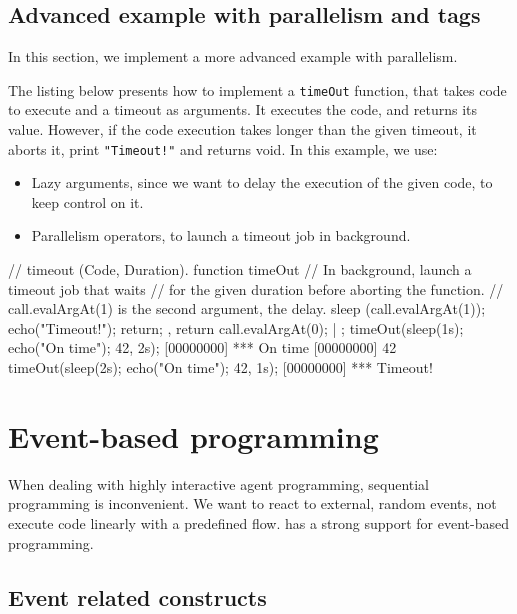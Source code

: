 \section{Advanced example with parallelism and tags}

In this section, we implement a more advanced example with
parallelism.

The listing below presents how to implement a \lstinline{timeOut}
function, that takes code to execute and a timeout as arguments. It
executes the code, and returns its value. However, if the code
execution takes longer than the given timeout, it aborts it, print
\lstinline|"Timeout!"| and returns void. In this example, we use:

\begin{itemize}
\item Lazy arguments, since we want to delay the execution of the
  given code, to keep control on it.
\item Parallelism operators, to launch a timeout job in background.
\end{itemize}

\begin{urbiscript}
// timeout (Code, Duration).
function timeOut
{
  // In background, launch a timeout job that waits
  // for the given duration before aborting the function.
  // call.evalArgAt(1) is the second argument, the delay.
  {
    sleep (call.evalArgAt(1));
    echo("Timeout!");
    return;
  },
  return call.evalArgAt(0);
} | {};
timeOut({sleep(1s); echo("On time"); 42}, 2s);
[00000000] *** On time
[00000000] 42
timeOut({sleep(2s); echo("On time"); 42}, 1s);
[00000000] *** Timeout!
\end{urbiscript}


\chapter{Event-based programming}
\label{sec:tut:event-prog}

When dealing with highly interactive agent programming, sequential
programming is inconvenient. We want to react to external, random
events, not execute code linearly with a predefined flow. \us has a
strong support for event-based programming.

\section{Event related constructs}


